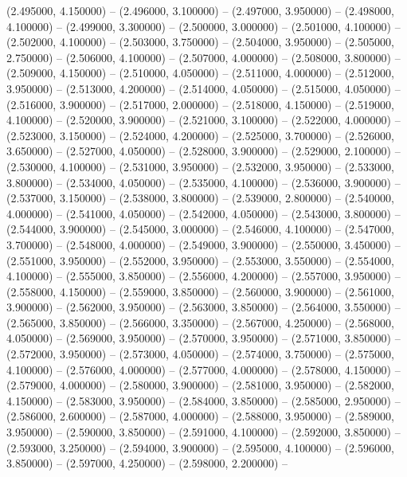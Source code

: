 (2.495000, 4.150000) -- 
(2.496000, 3.100000) -- 
(2.497000, 3.950000) -- 
(2.498000, 4.100000) -- 
(2.499000, 3.300000) -- 
(2.500000, 3.000000) -- 
(2.501000, 4.100000) -- 
(2.502000, 4.100000) -- 
(2.503000, 3.750000) -- 
(2.504000, 3.950000) -- 
(2.505000, 2.750000) -- 
(2.506000, 4.100000) -- 
(2.507000, 4.000000) -- 
(2.508000, 3.800000) -- 
(2.509000, 4.150000) -- 
(2.510000, 4.050000) -- 
(2.511000, 4.000000) -- 
(2.512000, 3.950000) -- 
(2.513000, 4.200000) -- 
(2.514000, 4.050000) -- 
(2.515000, 4.050000) -- 
(2.516000, 3.900000) -- 
(2.517000, 2.000000) -- 
(2.518000, 4.150000) -- 
(2.519000, 4.100000) -- 
(2.520000, 3.900000) -- 
(2.521000, 3.100000) -- 
(2.522000, 4.000000) -- 
(2.523000, 3.150000) -- 
(2.524000, 4.200000) -- 
(2.525000, 3.700000) -- 
(2.526000, 3.650000) -- 
(2.527000, 4.050000) -- 
(2.528000, 3.900000) -- 
(2.529000, 2.100000) -- 
(2.530000, 4.100000) -- 
(2.531000, 3.950000) -- 
(2.532000, 3.950000) -- 
(2.533000, 3.800000) -- 
(2.534000, 4.050000) -- 
(2.535000, 4.100000) -- 
(2.536000, 3.900000) -- 
(2.537000, 3.150000) -- 
(2.538000, 3.800000) -- 
(2.539000, 2.800000) -- 
(2.540000, 4.000000) -- 
(2.541000, 4.050000) -- 
(2.542000, 4.050000) -- 
(2.543000, 3.800000) -- 
(2.544000, 3.900000) -- 
(2.545000, 3.000000) -- 
(2.546000, 4.100000) -- 
(2.547000, 3.700000) -- 
(2.548000, 4.000000) -- 
(2.549000, 3.900000) -- 
(2.550000, 3.450000) -- 
(2.551000, 3.950000) -- 
(2.552000, 3.950000) -- 
(2.553000, 3.550000) -- 
(2.554000, 4.100000) -- 
(2.555000, 3.850000) -- 
(2.556000, 4.200000) -- 
(2.557000, 3.950000) -- 
(2.558000, 4.150000) -- 
(2.559000, 3.850000) -- 
(2.560000, 3.900000) -- 
(2.561000, 3.900000) -- 
(2.562000, 3.950000) -- 
(2.563000, 3.850000) -- 
(2.564000, 3.550000) -- 
(2.565000, 3.850000) -- 
(2.566000, 3.350000) -- 
(2.567000, 4.250000) -- 
(2.568000, 4.050000) -- 
(2.569000, 3.950000) -- 
(2.570000, 3.950000) -- 
(2.571000, 3.850000) -- 
(2.572000, 3.950000) -- 
(2.573000, 4.050000) -- 
(2.574000, 3.750000) -- 
(2.575000, 4.100000) -- 
(2.576000, 4.000000) -- 
(2.577000, 4.000000) -- 
(2.578000, 4.150000) -- 
(2.579000, 4.000000) -- 
(2.580000, 3.900000) -- 
(2.581000, 3.950000) -- 
(2.582000, 4.150000) -- 
(2.583000, 3.950000) -- 
(2.584000, 3.850000) -- 
(2.585000, 2.950000) -- 
(2.586000, 2.600000) -- 
(2.587000, 4.000000) -- 
(2.588000, 3.950000) -- 
(2.589000, 3.950000) -- 
(2.590000, 3.850000) -- 
(2.591000, 4.100000) -- 
(2.592000, 3.850000) -- 
(2.593000, 3.250000) -- 
(2.594000, 3.900000) -- 
(2.595000, 4.100000) -- 
(2.596000, 3.850000) -- 
(2.597000, 4.250000) -- 
(2.598000, 2.200000) -- 
